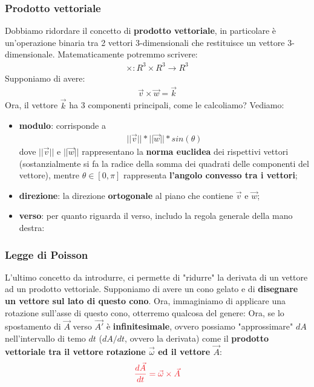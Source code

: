         \subsubsection{Prodotto vettoriale}
            Dobbiamo ridordare il concetto di \textbf{prodotto vettoriale}, in particolare è un'operazione binaria tra 2 vettori 3-dimensionali che restituisce un vettore 3-dimensionale. Matematicamente potremmo scrivere:
            \begin{align*}
                \times: R^3\times R^3\rightarrow R^3
            \end{align*}
            Supponiamo di avere:
            \begin{align*}
                \vec{v}\times\vec{w}=\vec{k}
            \end{align*}
            Ora, il vettore $\vec{k}$ ha 3 componenti principali, come le calcoliamo? Vediamo:
            \begin{itemize}
                \item \textbf{modulo}: corrisponde a
                \begin{align*}
                    ||\vec{v}||*||\vec{w}||*sin(\theta)
                \end{align*}
                dove $||\vec{v}||$ e $||\vec{w}||$ rappresentano la \textbf{norma euclidea} dei rispettivi vettori (sostanzialmente si fa la radice della somma dei quadrati delle componenti del vettore), mentre $\theta\in[0, \pi]$ rappresenta \textbf{l'angolo convesso tra i vettori};
                \item \textbf{direzione}: la direzione \textbf{ortogonale} al piano che contiene $\vec{v}$ e $\vec{w}$;
                \item \textbf{verso}: per quanto riguarda il verso, includo la regola generale della mano destra:
            \end{itemize}

        \subsubsection{Legge di Poisson} \label{Poisson}
            L'ultimo concetto da introdurre, ci permette di "ridurre" la derivata di un vettore ad un prodotto vettoriale. Supponiamo di avere un cono gelato e di \textbf{disegnare un vettore sul lato di questo cono}. Ora, immaginiamo di applicare una rotazione sull'asse di questo cono, otterremo qualcosa del genere:
            Ora, se lo spostamento di $\vec{A}$ verso $\vec{A'}$ è \textbf{infinitesimale}, ovvero
            possiamo "approssimare" $dA$ nell'intervallo di temo $dt$ ($dA/dt$, ovvero la derivata) come il \textbf{prodotto vettoriale tra il vettore rotazione $\vec{\omega}$ ed il vettore $\vec{A}$}:
            \begin{align*}
                \textcolor{Red}{\frac{d\vec{A}}{dt}=\vec{\omega}\times\vec{A}}
            \end{align*}


